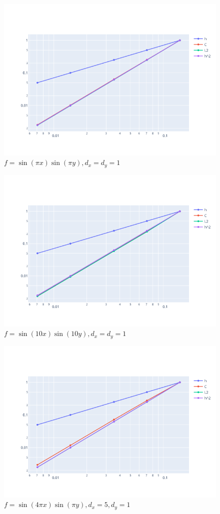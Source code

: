 \documentclass{article}
\begin{document}
\begin{figure}[htb!]
	\centering
	\includegraphics[width=.9\textwidth]{img/res1.png}
	\caption{$f = \sin(\pi x) \sin(\pi y), d_x = d_y = 1$}
\end{figure}

\begin{figure}[htb!]
	\centering
	\includegraphics[width=.9\textwidth]{img/res2.png}
	\caption{$f = \sin(10 x) \sin(10 y) , d_x = d_y = 1$}
\end{figure}

\begin{figure}[htb!]
	\centering
	\includegraphics[width=.9\textwidth]{img/res3.png}
	\caption{ $f = \sin(4 \pi x) \sin(\pi y), d_x = 5, d_y = 1$}
\end{figure}
\end{document}
